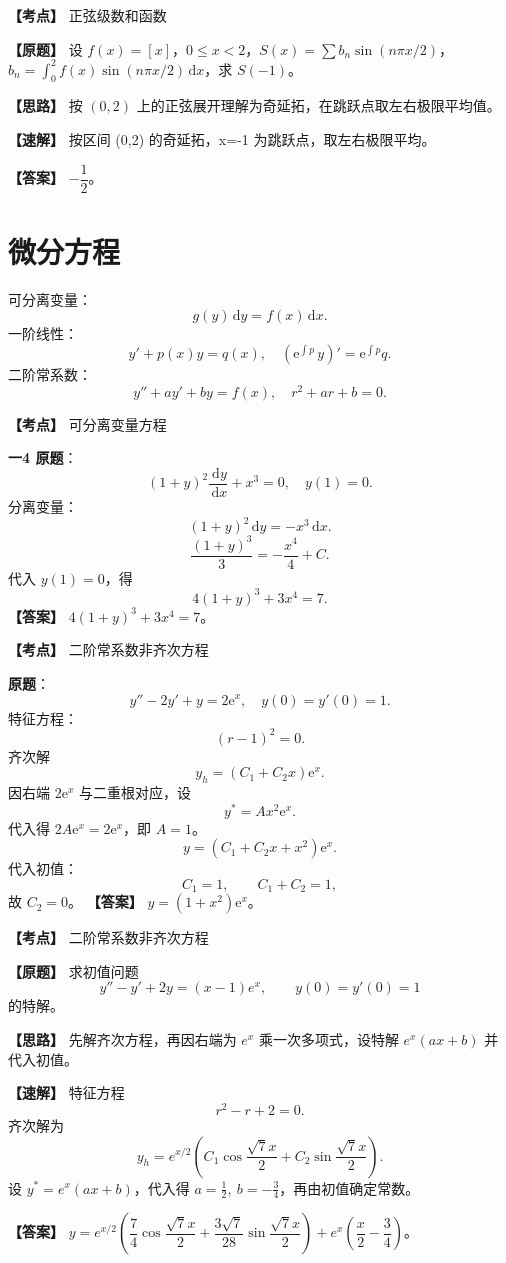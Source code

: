 ﻿\documentclass[11pt,a4paper,UTF8]{ctexart}
\newcommand{\dd}{\,\mathrm d}
\newcommand{\ee}{\mathrm e}
\begin{document}
\begin{answerbox}[2021--2022 一-4]
\textbf{【考点】} 正弦级数和函数

\textbf{【原题】} 设 $f(x)=[x]$，$0\le x<2$，$S(x)=\sum b_n\sin(n\pi x/2)$，$b_n=\int_0^2 f(x)\sin(n\pi x/2)\dd x$，求 $S(-1)$。

\textbf{【思路】} 按 $(0,2)$ 上的正弦展开理解为奇延拓，在跳跃点取左右极限平均值。

\textbf{【速解】} 按区间 (0,2) 的奇延拓，x=-1 为跳跃点，取左右极限平均。

\textbf{【答案】} $-\dfrac12$。
\end{answerbox}
\section{微分方程}

\begin{templatebox}[考试只保留三类]
可分离变量：
\[
g(y)\dd y=f(x)\dd x.
\]
一阶线性：
\[
y'+p(x)y=q(x),
\quad
\left(\ee^{\int p}\,y\right)'=\ee^{\int p}q.
\]
二阶常系数：
\[
y''+ay'+by=f(x),
\quad r^2+ar+b=0.
\]
\end{templatebox}

\begin{answerbox}[2020--2021 一-4]
\textbf{【考点】} 可分离变量方程

\textbf{一4 原题}：
\[
(1+y)^2\frac{\dd y}{\dd x}+x^3=0,
\quad y(1)=0.
\]
分离变量：
\[
(1+y)^2\dd y=-x^3\dd x.
\]
\[
\frac{(1+y)^3}{3}=-\frac{x^4}{4}+C.
\]
代入 $y(1)=0$，得
\[
4(1+y)^3+3x^4=7.
\]
\textbf{【答案】} $4(1+y)^3+3x^4=7$。

\end{answerbox}

\begin{answerbox}[2021--2022 三-10]
\textbf{【考点】} 二阶常系数非齐次方程

\textbf{原题}：
\[
y''-2y'+y=2\ee^x,
\quad y(0)=y'(0)=1.
\]
特征方程：
\[
(r-1)^2=0.
\]
齐次解
\[
y_h=(C_1+C_2x)\ee^x.
\]
因右端 $2\ee^x$ 与二重根对应，设
\[
y^*=Ax^2\ee^x.
\]
代入得 $2A\ee^x=2\ee^x$，即 $A=1$。
\[
y=(C_1+C_2x+x^2)\ee^x.
\]
代入初值：
\[
C_1=1,\qquad C_1+C_2=1,
\]
故 $C_2=0$。
\textbf{【答案】} $y=(1+x^2)\ee^x$。
\end{answerbox}

\newpage

\begin{answerbox}[2020--2021 二-9]
\textbf{【考点】} 二阶常系数非齐次方程

\textbf{【原题】} 求初值问题
\[
y''-y'+2y=(x-1)e^{x},\qquad y(0)=y'(0)=1
\]
的特解。

\textbf{【思路】} 先解齐次方程，再因右端为 $e^x$ 乘一次多项式，设特解 $e^x(ax+b)$ 并代入初值。

\textbf{【速解】} 特征方程
\[
r^2-r+2=0.
\]
齐次解为
\[
y_h=e^{x/2}\left(C_1\cos\frac{\sqrt7x}{2}+C_2\sin\frac{\sqrt7x}{2}\right).
\]
设 $y^*=e^x(ax+b)$，代入得 $a=\frac12,\ b=-\frac34$，再由初值确定常数。

\textbf{【答案】} $y=e^{x/2}\left(\dfrac74\cos\dfrac{\sqrt7x}{2}+\dfrac{3\sqrt7}{28}\sin\dfrac{\sqrt7x}{2}\right)+e^x\left(\dfrac x2-\dfrac34\right)$。
\end{answerbox}
\end{document}
